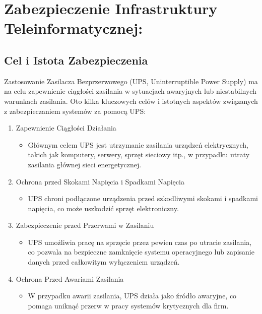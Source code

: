 \section{Zabezpieczenie Infrastruktury Teleinformatycznej:}
\subsection{Cel i Istota Zabezpieczenia}

Zastosowanie Zasilacza Bezprzerwowego (UPS, Uninterruptible Power Supply) ma na celu zapewnienie ciągłości zasilania w sytuacjach awaryjnych lub niestabilnych warunkach zasilania. Oto kilka kluczowych celów i istotnych aspektów związanych z zabezpieczaniem systemów za pomocą UPS:


\begin{enumerate}
    \item Zapewnienie Ciągłości Działania
        \begin{itemize}
            \item Głównym celem UPS jest utrzymanie zasilania urządzeń elektrycznych, takich jak komputery, serwery, sprzęt sieciowy itp., w przypadku utraty zasilania głównej sieci energetycznej.
        \end{itemize}


    \item Ochrona przed Skokami Napięcia i Spadkami Napięcia
        \begin{itemize}
            \item UPS chroni podłączone urządzenia przed szkodliwymi skokami i spadkami napięcia, co może uszkodzić sprzęt elektroniczny.
        \end{itemize}

    \item Zabezpieczenie przed Przerwami w Zasilaniu
        \begin{itemize}
            \item UPS umożliwia pracę na sprzęcie przez pewien czas po utracie zasilania, co pozwala na bezpieczne zamknięcie systemu operacyjnego lub zapisanie danych przed całkowitym wyłączeniem urządzeń.
        \end{itemize}

    \item Ochrona Przed Awariami Zasilania
        \begin{itemize}
            \item W przypadku awarii zasilania, UPS działa jako źródło awaryjne, co pomaga uniknąć przerw w pracy systemów krytycznych dla firm.
        \end{itemize}
    

\end{enumerate}
